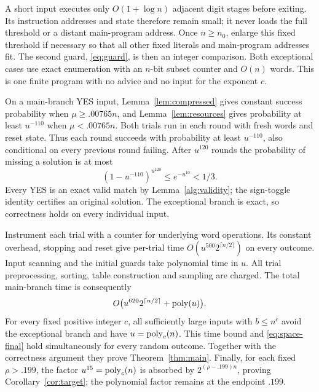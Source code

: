 A short input executes only \(O(1+\log n)\) adjacent digit stages
before exiting. Its instruction addresses and state therefore remain
small; it never loads the full threshold or a distant main-program
address. Once \(n\ge n_0\), enlarge this fixed threshold if necessary
so that all other fixed literals and main-program addresses fit.
The second guard, \eqref{eq:guard}, is then an integer comparison.
Both exceptional cases use exact enumeration with an \(n\)-bit subset
counter and \(O(n)\) words. This is one finite program with no advice
and no input for the exponent \(c\).

On a main-branch YES input, Lemma~\ref{lem:compressed} gives constant
success probability when \(\mu\ge.00765n\), and
Lemma~\ref{lem:resources} gives probability at least \(u^{-110}\)
when \(\mu<.00765n\). Both trials run in each round with fresh words
and reset state. Thus each round succeeds with probability at least
\(u^{-110}\), also conditional on every previous round failing.
After \(u^{120}\) rounds the probability of missing a solution is at
most
\[
 (1-u^{-110})^{u^{120}}\le e^{-u^{10}}<1/3.
\]
Every YES is an exact valid match by Lemma~\ref{alg:validity}; the
sign-toggle identity certifies an original solution. The exceptional
branch is exact, so correctness holds on every individual input.

Instrument each trial with a counter for underlying word operations.
Its constant overhead, stopping and reset give per-trial time
\(O(u^{500}2^{\lceil n/2\rceil})\) on every outcome. Input scanning
and the initial guards take polynomial time in \(u\). All trial
preprocessing, sorting, table construction and sampling are charged.
The total main-branch time is consequently
\[
 O\bigl(u^{620}2^{\lceil n/2\rceil}+\operatorname{poly}(u)\bigr).
\]
For every fixed positive integer \(c\), all sufficiently large inputs
with \(b\le n^c\) avoid the exceptional branch and have
\(u=\operatorname{poly}_c(n)\). This time bound and \eqref{eq:space-final} hold
simultaneously for every random outcome. Together with the correctness
argument they prove Theorem~\ref{thm:main}. Finally, for each fixed
\(\rho>.199\), the factor \(u^{15}=\operatorname{poly}_c(n)\) is absorbed by
\(2^{(\rho-.199)n}\), proving Corollary~\ref{cor:target}; the
polynomial factor remains at the endpoint \(.199\).
